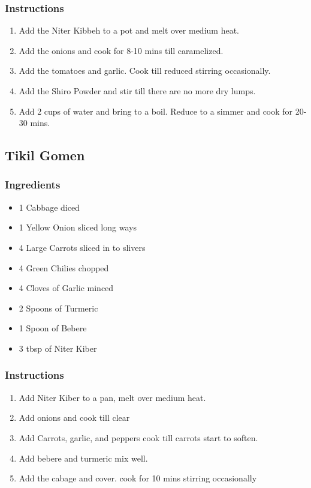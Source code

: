\documentclass[11pt]{article}
\begin{document}
\subsubsection*{Instructions}
\label{sec:orgdddf6e3}
\begin{enumerate}
\item Add the Niter Kibbeh to a pot and melt over medium heat.
\item Add the onions and cook for 8-10 mins till caramelized.
\item Add the tomatoes and garlic. Cook till reduced stirring occasionally.
\item Add the Shiro Powder and stir till there are no more dry lumps.
\item Add 2 cups of water and bring to a boil. Reduce to a simmer and cook for 20-30 mins.
\end{enumerate}
\subsection{Tikil Gomen}
\label{sec:org5522d33}
\subsubsection*{Ingredients}
\label{sec:org23d2353}
\begin{itemize}
\item 1 Cabbage diced
\item 1 Yellow Onion sliced long ways
\item 4 Large Carrots sliced in to slivers
\item 4 Green Chilies chopped
\item 4 Cloves of Garlic minced
\item 2 Spoons of Turmeric
\item 1 Spoon of Bebere
\item 3 tbsp of Niter Kiber
\end{itemize}
\subsubsection*{Instructions}
\label{sec:org2946e69}
\begin{enumerate}
\item Add Niter Kiber to a pan, melt over medium heat.
\item Add onions and cook till clear
\item Add Carrots, garlic, and peppers cook till carrots start to soften.
\item Add bebere and turmeric mix well.
\item Add the cabage and cover. cook for 10 mins stirring occasionally
\end{enumerate}
\end{document}
